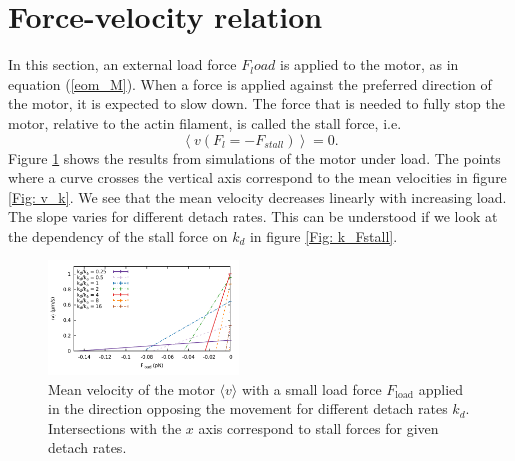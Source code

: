\documentclass[aps,pre,twocolumn,showpacs,showkeys,a4paper]{revtex4}
\begin{document}
\section{Force-velocity relation}
In this section, an external load force $F_load$ is applied to the motor, as in equation (\ref{eom_M}). 
When a force is applied against the preferred direction of the motor, it is expected to slow down. 
The force that is needed to fully stop the motor, relative to the actin filament, is called the stall force, i.e. 
\[
\left\langle v ( F_{l} = -F_{stall} ) \right\rangle = 0 .
\]
Figure \ref{Fig: F_v_zoom}  shows the results from simulations of the motor under load. 
The points where a curve crosses the vertical axis correspond to the mean velocities in figure \ref{Fig: v_k}. 
We see that the mean velocity decreases linearly with increasing load. 
The slope varies for different detach rates. This can be understood if we look at the dependency of the stall force on $k_{d}$ in figure \ref{Fig: k_Fstall}.
\begin{figure}[t]
\centering
\includegraphics[width=0.45\textwidth,height=!]{F_v_zoom}
\caption{Mean velocity of the motor $\langle v \rangle$ with a small load force $F_\text{load}$ applied in the direction opposing the movement for different detach rates $k_d$.
Intersections with the $x$ axis correspond to stall forces for given detach rates. 
}
\label{Fig: F_v_zoom} 
\end{figure}
\end{document}
